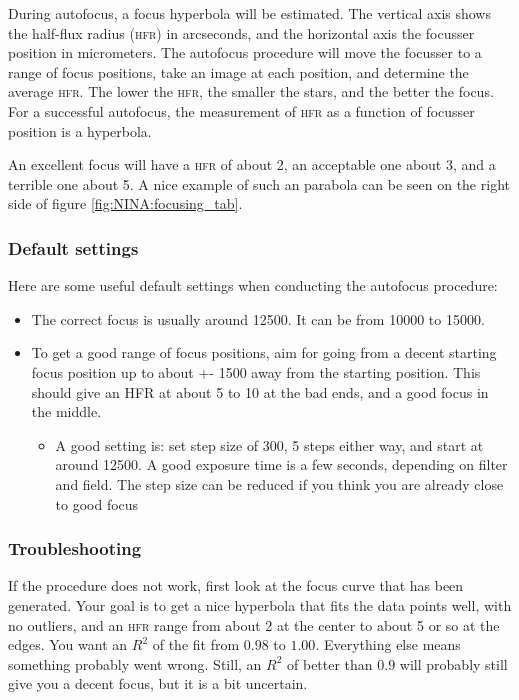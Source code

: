 \documentclass[a4paper, 11pt, fleqn]{memoir}
\begin{document}
During autofocus, a focus hyperbola will be estimated.
The vertical axis shows the half-flux radius (\textsc{hfr}) in arcseconds, and the horizontal axis the focusser position in micrometers.
The autofocus procedure will move the focusser to a range of focus positions, take an image at each position, and determine the average \textsc{hfr}.
The lower the \textsc{hfr}, the smaller the stars, and the better the focus.
For a successful autofocus, the measurement of \textsc{hfr} as a function of focusser position is a hyperbola.

An excellent focus will have a \textsc{hfr} of about 2, an acceptable one about 3, and a terrible one about 5. A nice example of such an parabola can be seen on the right side of figure \ref{fig:NINA:focusing_tab}.  %


\subsubsection*{Default settings} %

Here are some useful default settings when conducting the autofocus procedure:

\begin{itemize}
    \item The correct focus is usually around 12500.
          It can be from 10000 to 15000.
    \item
          To get a good range of focus positions, aim for going
          from a decent starting focus position up to about +- 1500 away from the starting position.
          This should give an HFR at about 5 to 10 at the bad ends, and a good focus in the middle.
          \begin{itemize}
              \item
                    A good setting is: set step size of 300, 5 steps either way, and start at
                    around 12500.
                    A good exposure time is a few seconds, depending on filter and field.
                    The step size can be reduced if you think you are already close to good focus
          \end{itemize}
\end{itemize}


\subsubsection*{Troubleshooting}
If the procedure does not work, first look at the focus curve that has been generated.
Your goal is to get a nice hyperbola that fits the data points well, with no outliers, and an \textsc{hfr} range from about 2 at the center to about 5 or so at the edges.
You want an $R^2$ of the fit from $0.98$ to $1.00$.
Everything else means something probably went wrong.
Still, an $R^2$ of better than $0.9$ will probably still give you a decent focus, but it is a bit uncertain.
\end{document}
